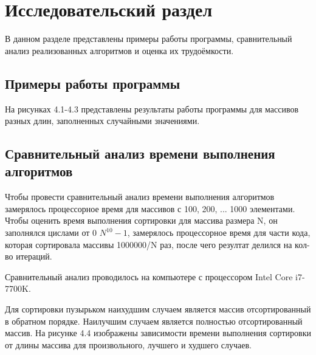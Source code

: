 \chapter{Исследовательский раздел}
В данном разделе представлены примеры работы программы, сравнительный анализ реализованных алгоритмов и оценка их трудоёмкости.

\section{Примеры работы программы}
На рисунках 4.1-4.3 представлены результаты работы программы для массивов разных длин, заполненных случайными значениями.




\newpage
\section{Сравнительный анализ времени выполнения алгоритмов}
Чтобы провести сравнительный анализ времени выполнения алгоритмов замерялось процессорное время для массивов с 100, 200, ... 1000 элементами. Чтобы оценить время выполнения сортировки для массива размера N, он заполнялся цислами от 0 $N^{10}-1$, замерялось процессорное время для части кода, которая сортировала массивы 1000000/N раз, после чего резултат делился на кол-во итераций.

Сравнительный анализ проводилось на компьютере с процессором Intel Core i7-7700K.

Для сортировки пузырьком наихудшим случаем является массив отсортированный в обратном порядке. Наилучшим случаем является полностью отсортированный массив. На рисунке 4.4 изображены зависимости времени выполнения сортировки от длины массива для произвольного, лучшего и худшего случаев. \cite{teoriya}

